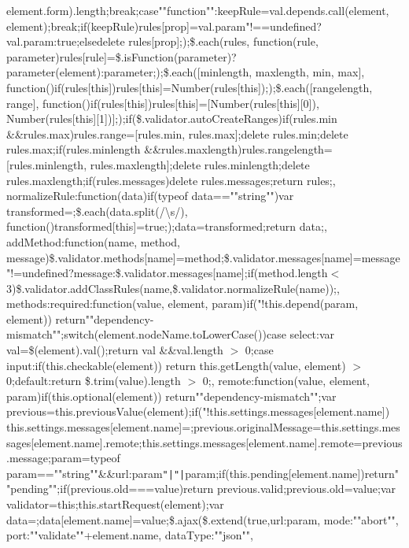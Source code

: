 element.\+form).\+length;break;case""function""\+:keep\+Rule=val.\+depends.\+call(element, element);break;\rcurly{}if(keep\+Rule)\lcurly{}rules[prop]=val.\+param"!==undefined?val.\+param\+:true;\rcurly{}else\lcurly{}delete rules[prop];\rcurly{}\rcurly{}\rcurly{});\$.\+each(rules, function(rule, parameter)\lcurly{}rules[rule]=\$.\+is\+Function(parameter)?parameter(element)\+:parameter;\rcurly{});\$.\+each([\textquotesingle{}minlength\textquotesingle{}, \textquotesingle{}maxlength\textquotesingle{}, \textquotesingle{}min\textquotesingle{}, \textquotesingle{}max\textquotesingle{}], function()\lcurly{}if(rules[this])\lcurly{}rules[this]=\+Number(rules[this]);\rcurly{}\rcurly{});\$.\+each([\textquotesingle{}rangelength\textquotesingle{}, \textquotesingle{}range\textquotesingle{}], function()\lcurly{}if(rules[this])\lcurly{}rules[this]=[Number(rules[this][0]), Number(rules[this][1])];\rcurly{}\rcurly{});if(\$.\+validator.\+auto\+Create\+Ranges)\lcurly{}if(rules.\+min \&\&rules.\+max)\lcurly{}rules.\+range=[rules.\+min, rules.\+max];delete rules.\+min;delete rules.\+max;\rcurly{}if(rules.\+minlength \&\&rules.\+maxlength)\lcurly{}rules.\+rangelength=[rules.\+minlength, rules.\+maxlength];delete rules.\+minlength;delete rules.\+maxlength;\rcurly{}\rcurly{}if(rules.\+messages)\lcurly{}delete rules.\+messages;\rcurly{}return rules;\rcurly{}, normalize\+Rule\+:function(data)\lcurly{}if(typeof data==""string"")\lcurly{}var transformed=\lcurly{}\rcurly{};\$.\+each(data.\+split(/\textbackslash{}s/), function()\lcurly{}transformed[this]=true;\rcurly{});data=transformed;\rcurly{}return data;\rcurly{}, add\+Method\+:function(name, method, message)\lcurly{}\$.\+validator.\+methods[name]=method;\$.\+validator.\+messages[name]=message"!=undefined?message\+:\$.\+validator.\+messages[name];if(method.\+length$<$ 3)\lcurly{}\$.\+validator.\+add\+Class\+Rules(name,\$.\+validator.\+normalize\+Rule(name));\rcurly{}\rcurly{}, methods\+:\lcurly{}required\+:function(value, element, param)\lcurly{}if("!this.\+depend(param, element)) return""dependency-\/mismatch"";switch(element.\+node\+Name.\+to\+Lower\+Case())\lcurly{}case \textquotesingle{}select\textquotesingle{}\+:var val=\$(element).\+val();return val \&\&val.\+length $>$ 0;case \textquotesingle{}input\textquotesingle{}\+:if(this.\+checkable(element)) return this.\+get\+Length(value, element) $>$ 0;default\+:return \$.\+trim(value).\+length $>$ 0;\rcurly{}\rcurly{}, remote\+:function(value, element, param)\lcurly{}if(this.\+optional(element)) return""dependency-\/mismatch"";var previous=this.\+previous\+Value(element);if("!this.\+settings.\+messages[element.\+name]) this.\+settings.\+messages[element.\+name]=\lcurly{}\rcurly{};previous.\+original\+Message=this.\+settings.\+messages[element.\+name].\+remote;this.\+settings.\+messages[element.\+name].\+remote=previous.\+message;param=typeof param==""string""\&\&\lcurly{}url\+:param\rcurly{}\texttt{"|}\texttt{"|}param;if(this.\+pending[element.\+name])\lcurly{}return""pending"";\rcurly{}if(previous.\+old===value)\lcurly{}return previous.\+valid;\rcurly{}previous.\+old=value;var validator=this;this.\+start\+Request(element);var data=\lcurly{}\rcurly{};data[element.\+name]=value;\$.\+ajax(\$.\+extend(true,\lcurly{}url\+:param, mode\+:""abort"", port\+:""validate""+element.\+name, data\+Type\+:""json"", 